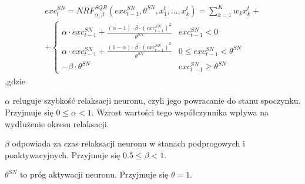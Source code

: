 \begin{equation}
\begin{split}
\label{eq:exc}
exc_t^{SN} = NRF_{\alpha, \beta}^{SQR}(exc_{t-1}^{SN},\theta^{SN},x_1^t, \dots, x_k^t) =  \sum\limits_{k=1}^K w_k x_k^t +\\
    + \begin{cases}
    \alpha \cdot exc_{t-1}^{SN} + \frac{(\alpha - 1) \cdot \beta \cdot (exc_{t-1}^{SN})^2}{\theta^{SN}} & exc_{t-1}^{SN} < 0 \\
    \alpha \cdot exc_{t-1}^{SN} + \frac{(1 - \alpha) \cdot \beta \cdot (exc_{t-1}^{SN})^2}{\theta^{SN}} & 0 \leq exc_{t-1}^{SN} < \theta^{SN} \\
    - \beta \cdot \theta^{SN} & exc_{t-1}^{SN} \geq \theta^{SN}
    \end{cases}
\end{split}
\end{equation}
,gdzie
\begin{description}
    \item $\alpha$ reluguje szybkość relaksacji neuronu, czyli jego powracanie do stanu spoczynku. Przyjmuje się $0 \leq \alpha < 1$. Wzrost
    wartości tego współczynnika wpływa na wydłużenie okresu relaksacji.
    \item $\beta$ odpowiada za czas relaksacji neuronu w stanach podprogowych i poaktywacyjnych. Przyjmuje się $0.5 \leq \beta < 1$.
    \item $\theta^{SN}$ to próg aktywacji neuronu. Przyjmuje się $\theta = 1$.
\end{description}





 


